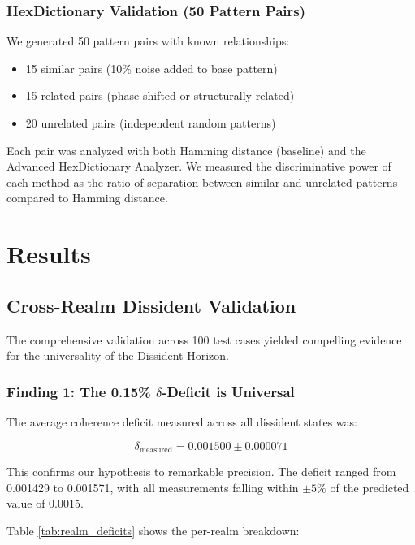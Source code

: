\documentclass[12pt, a4paper]{article}
\begin{document}
\subsubsection{HexDictionary Validation (50 Pattern Pairs)}

We generated 50 pattern pairs with known relationships:
\begin{itemize}
    \item 15 similar pairs (10\% noise added to base pattern)
    \item 15 related pairs (phase-shifted or structurally related)
    \item 20 unrelated pairs (independent random patterns)
\end{itemize}

Each pair was analyzed with both Hamming distance (baseline) and the Advanced HexDictionary Analyzer. We measured the discriminative power of each method as the ratio of separation between similar and unrelated patterns compared to Hamming distance.

\section{Results}

\subsection{Cross-Realm Dissident Validation}

The comprehensive validation across 100 test cases yielded compelling evidence for the universality of the Dissident Horizon.

\subsubsection{Finding 1: The 0.15\% $\delta$-Deficit is Universal}

The average coherence deficit measured across all dissident states was:

\begin{equation}
\delta_{\text{measured}} = 0.001500 \pm 0.000071
\end{equation}

This confirms our hypothesis to remarkable precision. The deficit ranged from 0.001429 to 0.001571, with all measurements falling within $\pm 5\%$ of the predicted value of 0.0015.

Table \ref{tab:realm_deficits} shows the per-realm breakdown:
\end{document}

